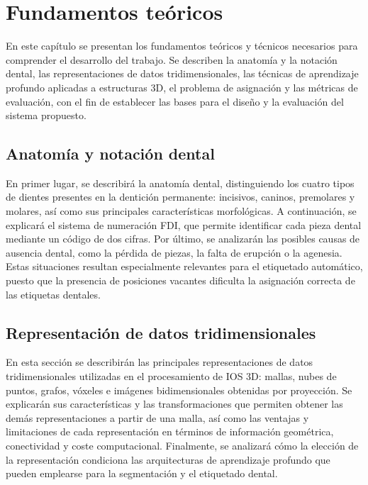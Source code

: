 \chapter{Fundamentos teóricos}
\label{cap:fundamentos}

En este capítulo se presentan los fundamentos teóricos y técnicos necesarios para comprender el desarrollo del trabajo. Se describen la anatomía y la notación dental, las representaciones de datos tridimensionales, las técnicas de aprendizaje profundo aplicadas a estructuras 3D, el problema de asignación y las métricas de evaluación, con el fin de establecer las bases para el diseño y la evaluación del sistema propuesto.

\section{Anatomía y notación dental}
\label{sec:notacion-dental}

En primer lugar, se describirá la anatomía dental, distinguiendo los cuatro tipos de dientes presentes en la dentición permanente: incisivos, caninos, premolares y molares, así como sus principales características morfológicas. A continuación, se explicará el sistema de numeración FDI, que permite identificar cada pieza dental mediante un código de dos cifras. Por último, se analizarán las posibles causas de ausencia dental, como la pérdida de piezas, la falta de erupción o la agenesia. Estas situaciones resultan especialmente relevantes para el etiquetado automático, puesto que la presencia de posiciones vacantes dificulta la asignación correcta de las etiquetas dentales.

\section{Representación de datos tridimensionales}
\label{sec:representacion-3d}

En esta sección se describirán las principales representaciones de datos tridimensionales utilizadas en el procesamiento de IOS 3D: mallas, nubes de puntos, grafos, vóxeles e imágenes bidimensionales obtenidas por proyección. Se explicarán sus características y las transformaciones que permiten obtener las demás representaciones a partir de una malla, así como las ventajas y limitaciones de cada representación en términos de información geométrica, conectividad y coste computacional. Finalmente, se analizará cómo la elección de la representación condiciona las arquitecturas de aprendizaje profundo que pueden emplearse para la segmentación y el etiquetado dental.

